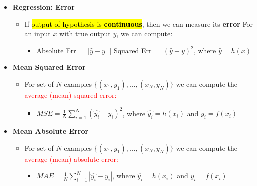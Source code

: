 \documentclass[10pt,landscape]{article}
\makeatletter
\renewcommand{\subsubsection}{\@startsection{subsubsection}{3}{0mm}%
                                {-1ex plus -.5ex minus -.2ex}%
                                {1ex plus .2ex}%
                                {\normalfont\small\bfseries}}
\makeatother
\begin{document}
\begin{multicols*}{3}
\begin{itemize}[topsep=0pt,noitemsep,wide=0pt, leftmargin=\dimexpr{} + 2\relax]
  \item \textbf{Regression: Error}
  \begin{itemize}[topsep=0pt,noitemsep,wide=0pt, leftmargin=\dimexpr{} + 2\relax]
    \item If \hl{output of hypothesis is \textbf{continuous}}, then we can measure its \textbf{error} For an input $x$ with true output $y$, we can compute:
    \begin{itemize}[topsep=0pt,noitemsep,wide=0pt, leftmargin=\dimexpr{} + 2\relax]
      \item Absolute Err $= |\hat{y} - y|$ | Squared Err $= (\hat{y} - y)^2$, where $\hat{y} = h(x)$
    \end{itemize}
  \end{itemize}
  \item \textbf{Mean Squared Error}
  \begin{itemize}[topsep=0pt,noitemsep,wide=0pt, leftmargin=\dimexpr{} + 2\relax]
    \item For set of $N$ examples $\{(x_1, y_1), \ldots, (x_N, y_N)\}$ we can compute the \textcolor{red}{average (mean) squared error:}
    \begin{itemize}[topsep=0pt,noitemsep,wide=0pt, leftmargin=\dimexpr{} + 2\relax]
      \item $MSE = \frac{1}{N} \sum^N_{i=1}(\hat{y_i} - y_i)^2$, where $\hat{y_i} = h(x_i)$ and $y_i = f(x_i)$
    \end{itemize}
  \end{itemize}
  \item \textbf{Mean Absolute Error}
  \begin{itemize}[topsep=0pt,noitemsep,wide=0pt, leftmargin=\dimexpr{} + 2\relax]
    \item For set of $N$ examples $\{(x_1, y_1), \ldots, (x_N, y_N)\}$ we can compute the \textcolor{red}{average (mean) absolute error:}
    \begin{itemize}[topsep=0pt,noitemsep,wide=0pt, leftmargin=\dimexpr{} + 2\relax]
      \item $MAE = \frac{1}{N} \sum^N_{i=1}|\hat{y_i} - y_i|$, where $\hat{y_i} = h(x_i)$ and $y_i = f(x_i)$

\end{itemize}
\end{itemize}
\end{itemize}
\end{multicols*}
\end{document}
